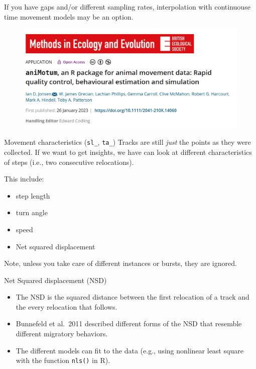 \documentclass[ignorenonframetext,,t]{beamer}
\providecommand{\tightlist}{%
\setlength{\itemsep}{0pt}\setlength{\parskip}{0pt}}
\providecommand{\tightlist}{%
\setlength{\itemsep}{0pt}\setlength{\parskip}{0pt}}
\renewcommand{\tightlist}{\setlength{\itemsep}{1.4ex}\setlength{\parskip}{0pt}}
\begin{document}
\begin{frame}
If you have gaps and/or different sampling rates, interpolation with
continuouse time movement models may be an option.

\begin{figure}

{\centering \includegraphics[width=0.85\linewidth]{../img/jonsen2023_mee} 

}

\end{figure}
\end{frame}

\begin{frame}{Movement characteristics (\texttt{sl\_}, \texttt{ta\_})}
\protect\hypertarget{movement-characteristics-sl_-ta_}{}
Tracks are still \emph{just} the points as they were collected. If we
want to get insights, we have can look at different characteristics of
steps (i.e., two consecutive relocations).

This include:

\begin{itemize}
\tightlist
\item
  step length
\item
  turn angle
\item
  speed
\item
  Net squared displacement
\end{itemize}

Note, unless you take care of different instances or bursts, they are
ignored.
\end{frame}

\begin{frame}[fragile]{Net Squared displacement (NSD)}
\protect\hypertarget{net-squared-displacement-nsd}{}
\begin{itemize}
\tightlist
\item
  The NSD is the squared distance between the first relocation of a
  track and the every relocation that follows.
\item
  Bunnefeld et al.~2011 described different forms of the NSD that
  resemble different migratory behaviors.
\item
  The different models can fit to the data (e.g., using nonlinear least
  square with the function \texttt{nls()} in R).
\end{itemize}
\end{frame}
\end{document}
